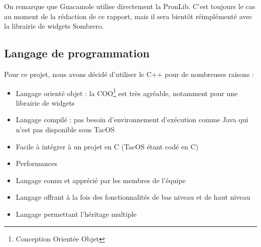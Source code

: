 On remarque que Guacamole utilise directement la PronLib.
C'est toujours le cas au moment de la rédaction de ce rapport, mais il sera bientôt réimplémenté avec la librairie de widgets Sombrero.

\subsection{Langage de programmation}

Pour ce projet, nous avons décidé d'utiliser le C++ pour de nombreuses raisons :

\begin{itemize}
  \item Langage orienté objet : la COO\footnote{Conception Orientée Objet} est très agréable, notamment pour une librairie de widgets
  \item Langage compilé : pas besoin d'environnement d'exécution comme Java qui n'est pas disponible sous TacOS
  \item Facile à intégrer à un projet en C (TacOS étant codé en C)
  \item Performances
  \item Langage connu et apprécié par les membres de l'équipe
  \item Langage offrant à la fois des fonctionnalités de bas niveau et de haut niveau
  \item Langage permettant l'héritage multiple
\end{itemize}
